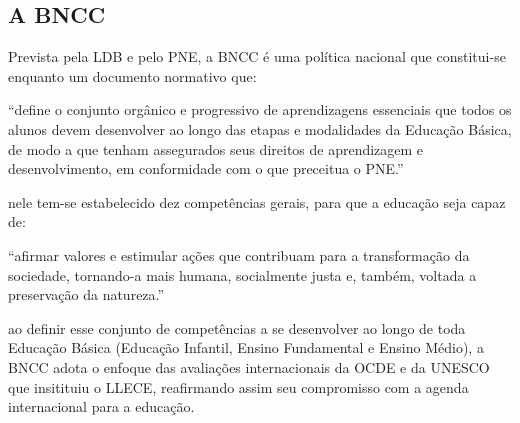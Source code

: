 \subsection{A BNCC} %
\label{sub:A BNCC}
Prevista pela \ac{LDB} e pelo \ac{PNE}, a \ac{BNCC} é uma política nacional que constitui-se enquanto um documento normativo que:

\begin{citacao}
	``define o conjunto orgânico e progressivo de aprendizagens essenciais que todos os alunos devem desenvolver ao longo das etapas e modalidades da Educação Básica, de modo a que tenham assegurados seus direitos de aprendizagem e desenvolvimento, em conformidade com o que preceitua o \ac{PNE}.'' \cite[pp.~7]{BRASIL:2018}
\end{citacao}
nele tem-se estabelecido dez competências gerais, para que a educação seja capaz de: 

\begin{citacao}
	``afirmar valores e estimular ações que contribuam para a transformação da sociedade, tornando-a mais humana, socialmente justa e, também, voltada a preservação da natureza.'' 
\end{citacao}
ao definir esse conjunto de competências a se desenvolver ao longo de toda Educação Básica (Educação Infantil, Ensino Fundamental e Ensino Médio), a \ac{BNCC} adota o enfoque das avaliações internacionais da \ac{OCDE} e da \ac{UNESCO} que insitituiu o \ac{LLECE}, reafirmando assim seu compromisso com a agenda internacional para a educação.

